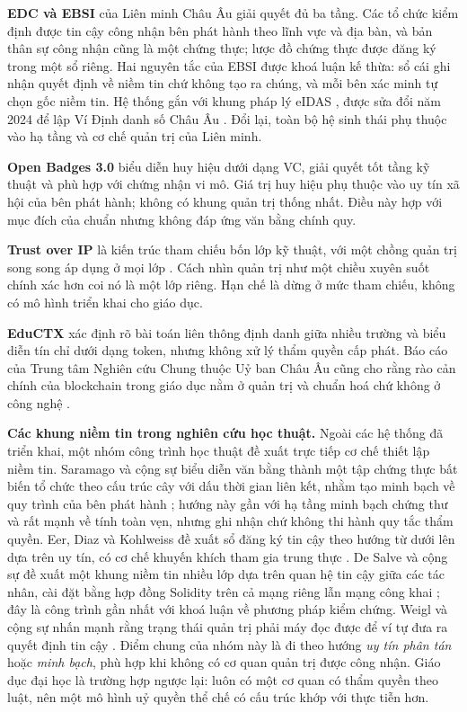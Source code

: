 \textbf{EDC và EBSI} của Liên minh Châu Âu \cite{EDC_ELM, EBSI_TrustModel} giải quyết đủ ba tầng. Các tổ chức kiểm định được tin cậy công nhận bên phát hành theo lĩnh vực và địa bàn, và bản thân sự công nhận cũng là một chứng thực; lược đồ chứng thực được đăng ký trong một sổ riêng. Hai nguyên tắc của EBSI được khoá luận kế thừa: sổ cái ghi nhận quyết định về niềm tin chứ không tạo ra chúng, và mỗi bên xác minh tự chọn gốc niềm tin. Hệ thống gắn với khung pháp lý eIDAS \cite{eIDAS2014}, được sửa đổi năm 2024 để lập Ví Định danh số Châu Âu \cite{eIDAS2_2024}. Đổi lại, toàn bộ hệ sinh thái phụ thuộc vào hạ tầng và cơ chế quản trị của Liên minh.

\textbf{Open Badges 3.0} \cite{OpenBadges2024} biểu diễn huy hiệu dưới dạng VC, giải quyết tốt tầng kỹ thuật và phù hợp với chứng nhận vi mô. Giá trị huy hiệu phụ thuộc vào uy tín xã hội của bên phát hành; không có khung quản trị thống nhất. Điều này hợp với mục đích của chuẩn nhưng không đáp ứng văn bằng chính quy.

\textbf{Trust over IP} \cite{ToIP_Stack2022} là kiến trúc tham chiếu bốn lớp kỹ thuật, với một chồng quản trị song song áp dụng ở mọi lớp \cite{ToIP_GovMetamodel2022}. Cách nhìn quản trị như một chiều xuyên suốt chính xác hơn coi nó là một lớp riêng. Hạn chế là dừng ở mức tham chiếu, không có mô hình triển khai cho giáo dục.

\textbf{EduCTX} \cite{Turkanovic2018} xác định rõ bài toán liên thông định danh giữa nhiều trường và biểu diễn tín chỉ dưới dạng token, nhưng không xử lý thẩm quyền cấp phát. Báo cáo của Trung tâm Nghiên cứu Chung thuộc Uỷ ban Châu Âu cũng cho rằng rào cản chính của blockchain trong giáo dục nằm ở quản trị và chuẩn hoá chứ không ở công nghệ \cite{Grech2017}.

\textbf{Các khung niềm tin trong nghiên cứu học thuật.} Ngoài các hệ thống đã triển khai, một nhóm công trình học thuật đề xuất trực tiếp cơ chế thiết lập niềm tin. Saramago và cộng sự biểu diễn văn bằng thành một tập chứng thực bất biến tổ chức theo cấu trúc cây với dấu thời gian liên kết, nhằm tạo minh bạch về quy trình của bên phát hành \cite{Saramago2021}; hướng này gần với hạ tầng minh bạch chứng thư và rất mạnh về tính toàn vẹn, nhưng ghi nhận chứ không thi hành quy tắc thẩm quyền. Eer, Diaz và Kohlweiss đề xuất sổ đăng ký tin cậy theo hướng từ dưới lên dựa trên uy tín, có cơ chế khuyến khích tham gia trung thực \cite{Eer2022}. De Salve và cộng sự đề xuất một khung niềm tin nhiều lớp dựa trên quan hệ tin cậy giữa các tác nhân, cài đặt bằng hợp đồng Solidity trên cả mạng riêng lẫn mạng công khai \cite{DeSalve2023}; đây là công trình gần nhất với khoá luận về phương pháp kiểm chứng. Weigl và cộng sự nhấn mạnh rằng trạng thái quản trị phải máy đọc được để ví tự đưa ra quyết định tin cậy \cite{Weigl2025}. Điểm chung của nhóm này là đi theo hướng \emph{uy tín phân tán} hoặc \emph{minh bạch}, phù hợp khi không có cơ quan quản trị được công nhận. Giáo dục đại học là trường hợp ngược lại: luôn có một cơ quan có thẩm quyền theo luật, nên một mô hình uỷ quyền thể chế có cấu trúc khớp với thực tiễn hơn.

